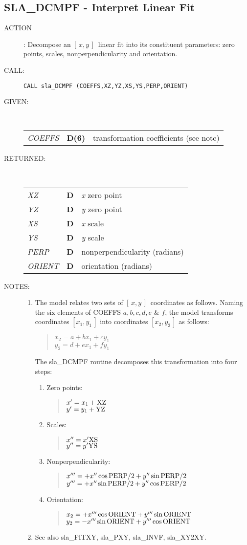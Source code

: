 \documentclass[11pt,twoside]{article}
\newcommand{\xlabel}[1]{}
\newcommand{\xy}        {$[\,x,y\,]$}
\newcommand{\routine}[3]
{\hbadness=10000
  \vbox
  {
    \rule{\textwidth}{0.3mm}\\
    {\Large {\bf #1} \hfill #2 \hfill {\bf #1}}\\
    \setlength{\oldspacing}{\topsep}
    \setlength{\topsep}{0.3ex}
    \begin{description}
      #3
    \end{description}
    \setlength{\topsep}{\oldspacing}
  }
}
\renewcommand{\routine}[3]
   {
      \subsection{#1\xlabel{#1} - #2\label{#1}}
       \begin{description}
         #3
       \end{description}
   }
\newcommand{\action}[1]
{\item[ACTION]: #1}
\newcommand{\action}[1]
   {\item[ACTION:] #1}
\newcommand{\call}[1]
{\item[CALL]: \hspace{0.4em}{\tt #1}}
\newlength{\oldspacing}
\renewcommand{\call}[1]
   {
    \item[CALL:] {\tt #1}
   }
\newcommand{\args}[2]
{
  \goodbreak
  \setlength{\oldspacing}{\topsep}
  \setlength{\topsep}{0.3ex}
  \begin{description}
  \item[#1]:\\[1.5ex]
    \begin{tabular}{p{7em}p{6em}p{22em}}
      #2
    \end{tabular}
  \end{description}
  \setlength{\topsep}{\oldspacing}
}
\renewcommand{\args}[2]
   {
     \begin{description}
        \item[#1:]\\
        \begin{tabular}{p{7em}p{6em}l}
           #2
        \end{tabular}
     \end{description}
   }
\newcommand{\spec}[3]
{
  {\em {#1}} & {\bf \mbox{#2}} & {#3}
}
\newcommand{\notes}[1]
{
  \goodbreak
  \setlength{\oldspacing}{\topsep}
  \setlength{\topsep}{0.3ex}
  \begin{description}
    \item[NOTES]:
        #1
  \end{description}
  \setlength{\topsep}{\oldspacing}
}
\renewcommand{\notes}[1]
   {
      \begin{description}
         \item[NOTES:]
            #1
      \end{description}
   }
\begin{document}
\routine{SLA\_DCMPF}{Interpret Linear Fit}
{
 \action{Decompose an \xy\ linear fit into its constituent parameters:
         zero points, scales, nonperpendicularity and orientation.}
 \call{CALL sla\_DCMPF (COEFFS,XZ,YZ,XS,YS,PERP,ORIENT)}
}
\args{GIVEN}
{
 \spec{COEFFS}{D(6)}{transformation coefficients (see note)}
}
\args{RETURNED}
{
 \spec{XZ}{D}{{\it x} zero point} \\
 \spec{YZ}{D}{{\it y} zero point} \\
 \spec{XS}{D}{{\it x} scale} \\
 \spec{YS}{D}{{\it y} scale} \\
 \spec{PERP}{D}{nonperpendicularity (radians)} \\
 \spec{ORIENT}{D}{orientation (radians)}
}
\notes
{
 \begin{enumerate}
  \item The model relates two sets of \xy\ coordinates as follows.
        Naming the six elements of COEFFS $a,b,c,d,e$ \& $f$,
        the model transforms coordinates $[x_{1},y_{1}\,]$ into coordinates
        $[x_{2},y_{2}\,]$ as follows:
        \begin{verse}
         $x_{2} = a + bx_{1} + cy_{1}$ \\
         $y_{2} = d + ex_{1} + fy_{1}$
        \end{verse}
        The sla\_DCMPF routine decomposes this transformation
        into four steps:
        \begin{enumerate}
        \item Zero points:
              \begin{verse}
               $x' = x_{1} + {\rm XZ}$ \\
               $y' = y_{1} + {\rm YZ}$
              \end{verse}
        \item Scales:
              \begin{verse}
               $x'' = x' {\rm XS}$ \\
               $y'' = y' {\rm YS}$
              \end{verse}
        \item Nonperpendicularity:
              \begin{verse}
               $x''' = + x'' \cos {\rm PERP}/2 + y'' \sin {\rm PERP}/2$ \\
               $y''' = + x'' \sin {\rm PERP}/2 + y'' \cos {\rm PERP}/2$
              \end{verse}
        \item Orientation:
              \begin{verse}
               $x_{2} = + x''' \cos {\rm ORIENT} +
                          y''' \sin {\rm ORIENT}$ \\
               $y_{2} = - x''' \sin {\rm ORIENT} +
                          y''' \cos {\rm ORIENT}$
              \end{verse}
        \end{enumerate}
  \item See also sla\_FITXY, sla\_PXY, sla\_INVF, sla\_XY2XY.
 \end{enumerate}
}
\end{document}

